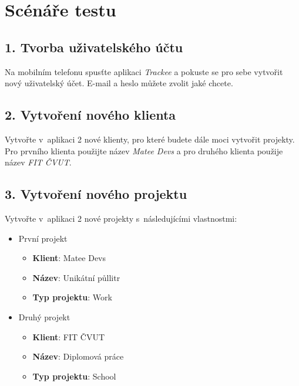 \section*{Scénáře testu}

\subsection*{1. Tvorba uživatelského účtu}

Na mobilním telefonu spusťte aplikaci \emph{Trackee} a pokuste se pro sebe vytvořit nový uživatelský účet. E-mail a heslo můžete zvolit jaké chcete.

\subsection*{2. Vytvoření nového klienta}

Vytvořte v aplikaci 2 nové klienty, pro které budete dále moci vytvořit projekty. Pro prvního klienta použijte název \emph{Matee Devs} a pro druhého klienta použije název \emph{FIT ČVUT}.

\subsection*{3. Vytvoření nového projektu}

Vytvořte v aplikaci 2 nové projekty s následujícími vlastnostmi:

\begin{itemize}
\item{První projekt}
  \begin{itemize}
  \item{\textbf{Klient}: Matee Devs}
  \item{\textbf{Název}: Unikátní půllitr}
  \item{\textbf{Typ projektu}: Work}
  \end{itemize}
\item{Druhý projekt}
  \begin{itemize}
  \item{\textbf{Klient}: FIT ČVUT}
  \item{\textbf{Název}: Diplomová práce}
  \item{\textbf{Typ projektu}: School} 
  \end{itemize}
\end{itemize}

